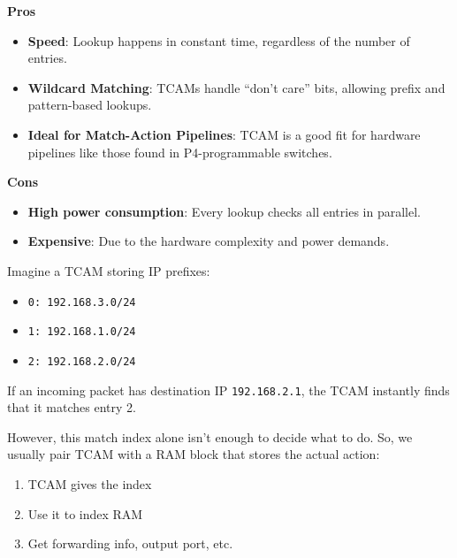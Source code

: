 \highspace
\begin{flushleft}
    \textcolor{Green3}{ \textbf{Pros}}
\end{flushleft}
\begin{itemize}
    \item[\textcolor{Green3}{\faIcon{check}}] \textcolor{Green3}{\textbf{Speed}}: Lookup happens in constant time, regardless of the number of entries.
    \item[\textcolor{Green3}{\faIcon{check}}] \textcolor{Green3}{\textbf{Wildcard Matching}}: TCAMs handle ``don't care'' bits, allowing prefix and pattern-based lookups.
    \item[\textcolor{Green3}{\faIcon{check}}] \textcolor{Green3}{\textbf{Ideal for Match-Action Pipelines}}: TCAM is a good fit for hardware pipelines like those found in P4-programmable switches.
\end{itemize}

\highspace
\begin{flushleft}
    \textcolor{Red2}{ \textbf{Cons}}
\end{flushleft}
\begin{itemize}
    \item[\textcolor{Red2}{\faIcon{times}}] \textcolor{Red2}{\textbf{High power consumption}}: Every lookup checks all entries in parallel.
    \item[\textcolor{Red2}{\faIcon{times}}] \textcolor{Red2}{\textbf{Expensive}}: Due to the hardware complexity and power demands.
\end{itemize}

\begin{examplebox}
    Imagine a TCAM storing IP prefixes:
    \begin{itemize}
        \item \texttt{0: 192.168.3.0/24}
        \item \texttt{1: 192.168.1.0/24}
        \item \texttt{2: 192.168.2.0/24}
    \end{itemize}
    If an incoming packet has destination IP \texttt{192.168.2.1}, the TCAM instantly finds that it matches entry 2.

    However, this match index alone isn't enough to decide what to do. So, we usually pair TCAM with a RAM block that stores the actual action:
    \begin{enumerate}
        \item TCAM gives the index
        \item Use it to index RAM
        \item Get forwarding info, output port, etc.
    \end{enumerate}
\end{examplebox}

